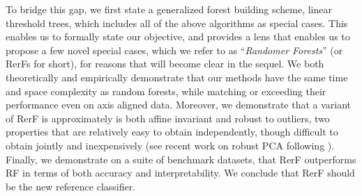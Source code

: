 \documentclass{article} %
\begin{document}
To bridge this gap, we first state a generalized forest building scheme, linear threshold trees, which includes all of the above algorithms as special cases.  This enables us to formally state our objective, and provides a lens that enables us to propose a few novel special cases, which we refer to as ``{\em{Randomer Forests}}''  (or RerFs for short), for reasons that will become clear in the sequel.  We both theoretically and empirically demonstrate that our methods have the same time and space complexity as random forests, while matching or exceeding their performance even on axis aligned data.  Moreover, we demonstrate that a variant of RerF is approximately is both affine invariant and robust to outliers, two properties that are relatively easy to obtain independently, though difficult to obtain jointly and inexpensively (see recent work on robust PCA following \cite{Candes2009}). Finally, we demonstrate on a suite of benchmark datasets, that RerF outperforms RF in terms of both accuracy and interpretability.  We conclude that RerF should be the new reference classifier.




\end{document}
